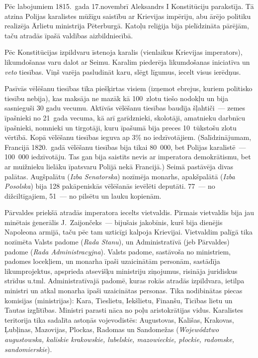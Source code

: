 \documentclass[twoside,a5paper,12pt,fleqn,openany]{extbook}
\newcommand{\pltxti}[1]{\textit{\textpolish{#1}}}
\newcommand{\latxti}[1]{\textit{\textlatin{#1}}}
\begin{document}
Pēc labojumiem 1815.~gada 17.novembrī Aleksandrs I Konstitūciju parakstīja. Tā atzina Polijas karalistes mūžīgu saistību ar Krievijas impēriju, abu ārējo politiku realizēja Ārlietu ministrija Pēterburgā. Katoļu reliģija bija pielīdzināta pārējām, taču atradās īpašā valdības aizbildniecībā.

Pēc Konstitūcijas izpildvaru īstenoja karalis (vienlaikus Krievijas imperators), likumdošanas varu dalot ar Seimu. Karalim piederēja likumdošanas iniciatīva un \latxti{veto} tiesības. Viņš varēja pasludināt karu, slēgt līgumus, iecelt visus ierēdņus.

Pasīvās vēlēšanu tiesības tika piešķirtas visiem (izņemot ebrejus, kuriem politisko tiesību nebija), kas maksāja ne mazāk kā 100~zlotu tiešo nodokļu un bija sasnieguši 30 gadu vecumu. Aktīvās vēlēšanu tiesības baudīja šļahtiči~--- zemes īpašnieki no 21~gada vecuma, kā arī garīdznieki, skolotāji, amatnieku darbnīcu īpašnieki, nomnieki un tirgotāji, kuru īpašumā bija preces 10~tūkstošu zlotu vērtībā. Kopā vēlēšanu tiesības ieguva ap 3\% no iedzīvotājiem. (Salīdzinājumam, Francijā 1820.~gadā vēlēšanu tiesības bija tikai 80~000, bet Polijas karalistē~--- 100~000 iedzīvotāju. Tas gan bija saistīts nevis ar imperatora demokrātismu, bet ar muižnieku lielāku īpatsvaru Polijā nekā Francijā.) Seimā pastāvēja divas palātas. Augšpalātu (\pltxti{Izba Senatorska}) nozīmēja monarhs, apakšpalātā (\pltxti{Izba Posolska}) bija 128 pakāpeniskās vēlēšanās ievēlēti deputāti. 77~--- no dižciltīgajiem, 51~--- no pilsētu un lauku kopienām.

Pārvaldes priekšā atradās imperatora iecelts vietvaldis. Pirmais vietvaldis bija jau minētais ģenerālis J.~Zaijončeks~--- bijušais jakobīnis, kurš bija dienējis Napoleona armijā, taču pēc tam uzticīgi kalpoja Krievijai. Vietvaldim palīgā tika nozīmēta Valsts padome (\pltxti{Rada Stanu}), un Administratīvā (jeb Pārvaldes) padome (\pltxti{Rada Administracyjna}). Valsts padome, sastāvoša no ministriem, padomes locekļiem, un monarha īpaši uzaicinātām personām, sastādīja likumprojektus, apsprieda atsevišķu ministriju ziņojumus, risināja juridiskus strīdus u.tml. Administratīvajā padomē, kuras rokās atradās izpildvara, ietilpa ministri un atkal monarha īpaši uzaicinātas personas. Tika nodibinātas piecas komisijas (ministrijas): Kara, Tieslietu, Iekšlietu, Finanšu, Ticības lietu un Tautas izglītības. Ministri parasti nāca no poļu aristokrātijas vidus. Karalistes teritorija tika sadalīta astoņās vojevodistēs: Augustovas, Kališas, Krakovas, Ļubļinas, Mazovijas, Plockas, Radomas un Sandomežas (\pltxti{Województwo augustowska, kaliskie krakowskie, lubelskie, mazowieckie, płockie, radomske, sandomierskie}).
\end{document}
